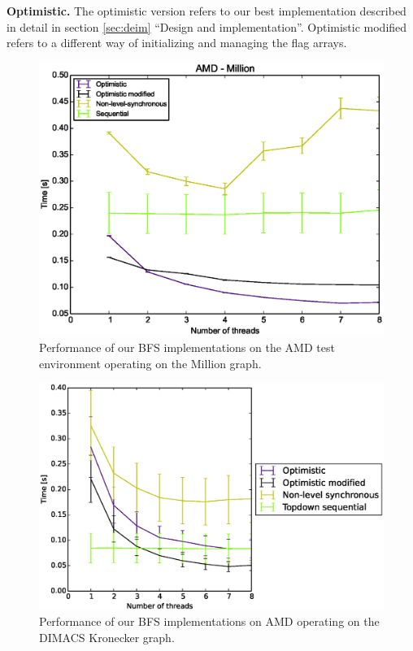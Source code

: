 \documentclass[letterpaper]{article}
\newcommand{\mypar}[1]{{\bf #1.}} %
\begin{document}
		\mypar{Optimistic}
		The optimistic version refers to our best implementation described in detail in section \ref{sec:deim} ``Design and implementation''.
		Optimistic modified refers to a different way of initializing and managing the flag arrays.


		\begin{figure}[t]
			\centering
	  		\includegraphics[scale=0.33]{amd_million.eps}
	  		\vspace*{-0.3cm}
	  		\caption{Performance of our BFS implementations on the AMD test environment operating on the Million graph.\label{fig:amdbig}}
		\end{figure}
		
		\begin{figure}[t]
			\centering
	  		\includegraphics[scale=0.33]{amd_dimacskron.eps}
	  		\vspace*{-0.3cm}
	  		\caption{Performance of our BFS implementations on AMD operating on the DIMACS Kronecker graph.\label{fig:amdkron}}
		\end{figure}
\end{document}
